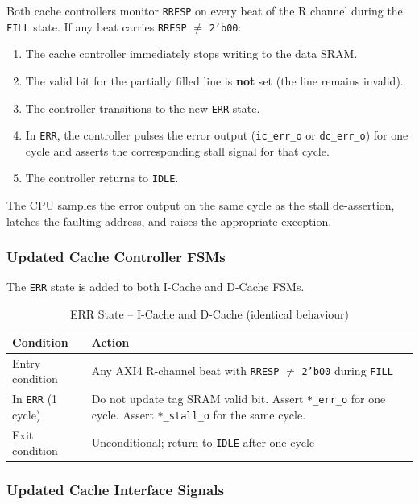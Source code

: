 Both cache controllers monitor \texttt{RRESP} on every beat of the R
channel during the \texttt{FILL} state.
If any beat carries \texttt{RRESP} $\neq$ \texttt{2'b00}:

\begin{enumerate}
  \item The cache controller immediately stops writing to the data SRAM.
  \item The valid bit for the partially filled line is \textbf{not} set
    (the line remains invalid).
  \item The controller transitions to the new \texttt{ERR} state.
  \item In \texttt{ERR}, the controller pulses the error output
    (\texttt{ic\_err\_o} or \texttt{dc\_err\_o}) for one cycle and
    asserts the corresponding stall signal for that cycle.
  \item The controller returns to \texttt{IDLE}.
\end{enumerate}

The CPU samples the error output on the same cycle as the stall
de-assertion, latches the faulting address, and raises the appropriate
exception.

\subsubsection{Updated Cache Controller FSMs}

The \texttt{ERR} state is added to both I-Cache and D-Cache FSMs.

\begin{table}[H]
\caption{ERR State -- I-Cache and D-Cache (identical behaviour)}
\label{tab:asErrState}
\centering
\begin{tabularx}{\textwidth}{|l |X|}
  \hline
  Condition & Action \\
  \hline
  \hline
  Entry condition &
    Any AXI4 R-channel beat with \texttt{RRESP} $\neq$ \texttt{2'b00}
    during \texttt{FILL} \\
  \hline
  In \texttt{ERR} (1 cycle) &
    Do not update tag SRAM valid bit.
    Assert \texttt{*\_err\_o} for one cycle.
    Assert \texttt{*\_stall\_o} for the same cycle. \\
  \hline
  Exit condition &
    Unconditional; return to \texttt{IDLE} after one cycle \\
  \hline
\end{tabularx}
\end{table}

\subsubsection{Updated Cache Interface Signals}

